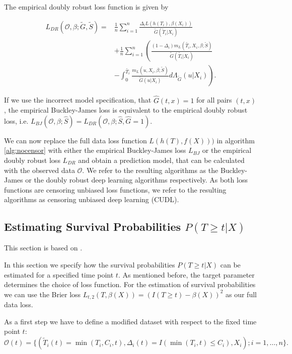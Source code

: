 \documentclass[12pt, a4paper]{article}
\theoremstyle{definition}
\theoremstyle{plain}
\numberwithin{equation}{section}
\numberwithin{figure}{section}
\numberwithin{table}{section}
\begin{document}
	The empirical doubly robust loss function is given by
	
	\begin{equation*}
	\begin{split}
	L_{DR}(\mathcal{O}, \beta; \tilde{G}, \tilde{S}) = & \frac{1}{n} \sum_{i=1}^n \frac{\Delta_i L(h(T_i),\beta(X_i))}{\tilde{G}(\tilde{T}_i\vert X_i)}\\
	~ & + \frac{1}{n} \sum_{i=1}^n \left(\frac{(1-\Delta_i)m_L(\tilde{T_i}, X_i, \beta; \tilde{S})}{\tilde{G}(\tilde{T_i}\vert X_i)} \right.\\
	& - \left. \int _0^{\tilde{T_i}} \frac{m_L(u, X_i, \beta; \tilde{S})}{\tilde{G}(u \vert X_i)} d \Lambda_{\tilde{G}}(u \vert X_i) \right).
	\end{split}
	\end{equation*}
	
	If we use the incorrect model specification, that $\hat{G}(t,x)=1$ for all pairs $(t,x)$, the empirical  Buckley-James loss is equivalent to the empirical doubly robust loss, i.e. $L_{BJ}(\mathcal{O}, \beta; \hat{S})=L_{DR}(\mathcal{O}, \beta; \hat{S}, \hat{G} = 1)$.
	
	We can now replace the full data loss function $L(h(T), f(X)))$ in algorithm \ref{alg:nocensor} with either the empirical Buckley-James loss $L_{BJ}$ or the empirical doubly robust loss $L_{DR}$ and obtain a prediction model, that can be calculated with the observed data $\mathcal{O}$.
	We refer to the resulting algorithms as the Buckley-James or the doubly robust deep learning algorithms respectively.
	As both loss functions are censoring unbiased loss functions, we refer to the resulting algorithms as censoring unbiased deep learning (CUDL). 
	
	\subsection{Estimating Survival Probabilities $P(T\geq t \vert X)$}
	
	This section is based on \citet*{basearticle}.
	
	In this section we specify how the survival probabilities $P(T\geq t \vert X)$ can be estimated for a specified time point $t$.
	As mentioned before, the target parameter determines the choice of loss function.
	For the estimation of survival probabilities we can use the Brier loss $L_{t,2}(T, \beta(X)) = (I(T \geq t) - \beta(X))^2$ as our full data loss.
	
	As a first step we have to define a modified dataset with respect to the fixed time point $t$:
	\begin{equation*}
		\mathcal{O}(t) = \{(\tilde{T}_i(t)=\min(T_i, C_i, t), \Delta_i(t) = I(\min(T_i, t) \leq C_i), X_i); i = 1,\dots,n\}.
	\end{equation*}
	
\end{document}
